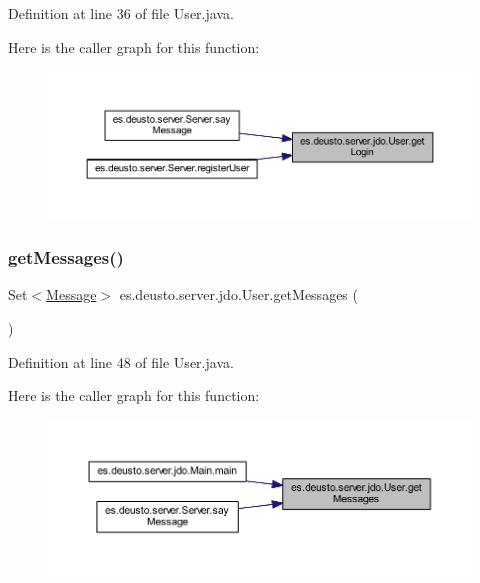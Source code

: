 Definition at line 36 of file User.\+java.

Here is the caller graph for this function\+:
\nopagebreak
\begin{figure}[H]
\begin{center}
\leavevmode
\includegraphics[width=350pt]{classes_1_1deusto_1_1server_1_1jdo_1_1_user_aad8107ea8f9281199377f705d541bf8e_icgraph}
\end{center}
\end{figure}
\mbox{\label{classes_1_1deusto_1_1server_1_1jdo_1_1_user_a29a7cd0e1f989cbe4d12a2da397d2462}} 
\subsubsection{\texorpdfstring{getMessages()}{getMessages()}}
{\footnotesize\ttfamily Set$<$\mbox{\hyperlink{classes_1_1deusto_1_1server_1_1jdo_1_1_message}{Message}}$>$ es.\+deusto.\+server.\+jdo.\+User.\+get\+Messages (\begin{DoxyParamCaption}{ }\end{DoxyParamCaption})}



Definition at line 48 of file User.\+java.

Here is the caller graph for this function\+:
\nopagebreak
\begin{figure}[H]
\begin{center}
\leavevmode
\includegraphics[width=350pt]{classes_1_1deusto_1_1server_1_1jdo_1_1_user_a29a7cd0e1f989cbe4d12a2da397d2462_icgraph}
\end{center}
\end{figure}
\mbox{\label{classes_1_1deusto_1_1server_1_1jdo_1_1_user_a1900ee126da22ed0f043e0077e8be049}} 
